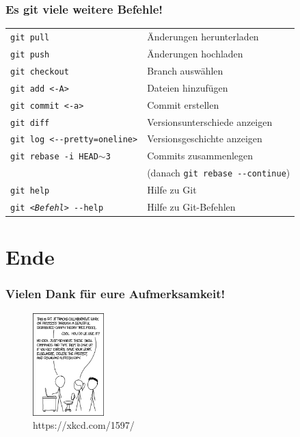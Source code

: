 \documentclass[accentcolor=tud8b,colorbacktitle,inverttitle,landscape,german,presentation,t]{tudbeamer}
\begin{document}
			\begin{frame}
				\frametitle{Es git viele weitere Befehle!}
					\begin{tabular}{ll}
						\texttt{git pull} & Änderungen herunterladen\\
						\texttt{git push} & Änderungen hochladen\\
						\texttt{git checkout} & Branch auswählen\\
						\texttt{git add <-A>} & Dateien hinzufügen\\
						\texttt{git commit <-a>} & Commit erstellen\\
						\texttt{git diff} & Versionsunterschiede anzeigen\\
						\texttt{git log <-{-}pretty=oneline>} & Versionsgeschichte anzeigen\\
						\texttt{git rebase -i HEAD$\sim$3} & Commits zusammenlegen\\&(danach \texttt{git rebase -{-}continue})\\
						\texttt{git help} & Hilfe zu Git\\
						\texttt{git \textit{<Befehl>} -{-}help} & Hilfe zu Git-Befehlen
					\end{tabular}
			\end{frame}
		
\section{Ende}			
			
			\begin{frame}
				\frametitle{Vielen Dank für eure Aufmerksamkeit!}
					\begin{figure}[]
						\includegraphics[height=150px]{git_comic}
						\caption{https://xkcd.com/1597/}
						\label{fig1}
					\end{figure}
			\end{frame}
			
\end{document}
